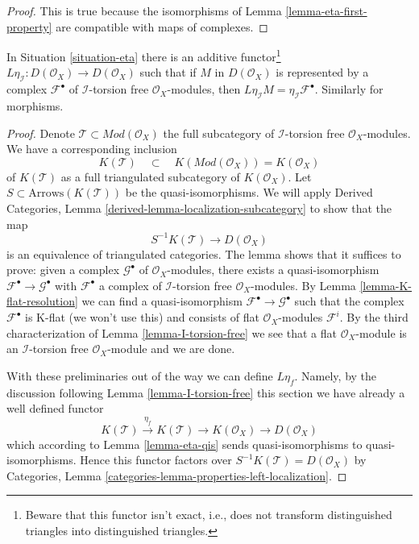 \begin{proof}
This is true because the isomorphisms of Lemma \ref{lemma-eta-first-property}
are compatible with maps of complexes.
\end{proof}

\begin{lemma}
\label{lemma-Leta}
In Situation \ref{situation-eta} there is an additive
functor\footnote{Beware that this functor isn't exact, i.e.,
does not transform distinguished triangles into distinguished triangles.}
$L\eta_\mathcal{I} : D(\mathcal{O}_X) \to D(\mathcal{O}_X)$
such that if $M$ in $D(\mathcal{O}_X)$ is represented by a complex
$\mathcal{F}^\bullet$ of $\mathcal{I}$-torsion free $\mathcal{O}_X$-modules,
then $L\eta_\mathcal{I}M = \eta_\mathcal{I}\mathcal{F}^\bullet$.
Similarly for morphisms.
\end{lemma}

\begin{proof}
Denote $\mathcal{T} \subset \textit{Mod}(\mathcal{O}_X)$ the full subcategory
of $\mathcal{I}$-torsion free $\mathcal{O}_X$-modules.
We have a corresponding inclusion
$$
K(\mathcal{T})
\quad\subset\quad
K(\textit{Mod}(\mathcal{O}_X)) = K(\mathcal{O}_X)
$$
of $K(\mathcal{T})$ as a full triangulated subcategory of $K(\mathcal{O}_X)$.
Let $S \subset \text{Arrows}(K(\mathcal{T}))$ be the quasi-isomorphisms.
We will apply
Derived Categories, Lemma \ref{derived-lemma-localization-subcategory}
to show that the map
$$
S^{-1}K(\mathcal{T}) \longrightarrow D(\mathcal{O}_X)
$$
is an equivalence of triangulated categories. The lemma shows that
it suffices to prove: given a complex $\mathcal{G}^\bullet$ of
$\mathcal{O}_X$-modules,
there exists a quasi-isomorphism $\mathcal{F}^\bullet \to \mathcal{G}^\bullet$
with $\mathcal{F}^\bullet$
a complex of $\mathcal{I}$-torsion free $\mathcal{O}_X$-modules.
By Lemma \ref{lemma-K-flat-resolution} we can find a quasi-isomorphism
$\mathcal{F}^\bullet \to \mathcal{G}^\bullet$ such that the complex
$\mathcal{F}^\bullet$ is K-flat (we won't use this) and
consists of flat $\mathcal{O}_X$-modules $\mathcal{F}^i$.
By the third characterization of Lemma \ref{lemma-I-torsion-free}
we see that a flat $\mathcal{O}_X$-module is an
$\mathcal{I}$-torsion free $\mathcal{O}_X$-module
and we are done.

\medskip\noindent
With these preliminaries out of the way we can define $L\eta_f$.
Namely, by the discussion following Lemma \ref{lemma-I-torsion-free}
this section we have already a well defined functor
$$
K(\mathcal{T}) \xrightarrow{\eta_f} K(\mathcal{T}) \to
K(\mathcal{O}_X) \to D(\mathcal{O}_X)
$$
which according to Lemma \ref{lemma-eta-qis} sends quasi-isomorphisms
to quasi-isomorphisms. Hence this functor factors over
$S^{-1}K(\mathcal{T}) = D(\mathcal{O}_X)$ by
Categories, Lemma \ref{categories-lemma-properties-left-localization}.
\end{proof}

